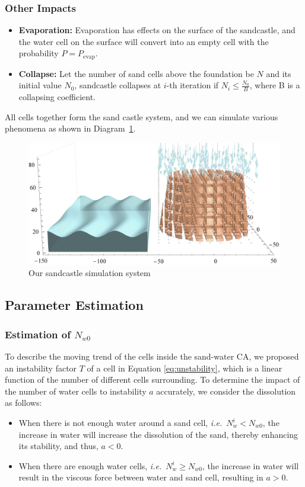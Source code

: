 \documentclass{mcmthesis}		    %
\def\ie{\mbox{\textit{i.e.}}}
\begin{document}
	\subsubsection{Other Impacts}
	\begin{itemize}

	\item \textbf{Evaporation:} Evaporation has effects on the surface of the sandcastle, and the water cell on the surface will convert into an empty cell with the probability $P=P_\text{evap}$.
    
    \item \textbf{Collapse:} Let the number of sand cells above the foundation be $N$ and its initial value $N_0$, sandcastle collapses at $i$-th iteration if $N_i \leq \frac{N_0}{B}$, where B is a collapsing coefficient.
	\end{itemize}

	All cells together form the sand castle system, and we can simulate various phenomena as shown in Diagram~\ref{fig:whole}.
	
		\begin{figure}[thbp!]
		\centering
		\includegraphics[width=0.75\columnwidth]{brownCell-clearWave-Rain.pdf}
		\caption{Our sandcastle simulation system}
		\label{fig:whole}
	\end{figure}
	
	
	
    \subsection{Parameter Estimation}
	\subsubsection{Estimation of $N_{w0}$}\label{section:nw0}
	To describe the moving trend of the cells inside the sand-water CA, we proposed an instability factor $T$ of a cell in Equation \ref{eq:unstability}, which is a linear function of the number of different cells surrounding. To determine the impact of the number of water cells to instability $a$ accurately, we consider the dissolution as follows:
	\begin{itemize}
	    \item When there is not enough water around a sand cell, \ie~$N_w^{i} < N_{w0}$, the increase in water will increase the dissolution of the sand, thereby enhancing its stability, and thus, $a<0$.
	    \item When there are enough water cells, \ie~$N_w^{i} \geq N_{w0}$, the increase in water will result in the viscous force between water and sand cell, resulting in $a>0$.
	\end{itemize}
	
\end{document}
